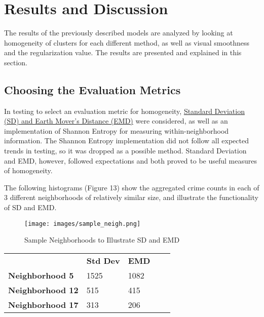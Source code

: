 \documentclass[times new roman,12pt]{article}
\begin{document}
\newpage

\section{Results and Discussion}
\label{res}

The results of the previously described models are analyzed by looking at homogeneity of clusters for each different method, as well as visual smoothness and the regularization value. The results are presented and explained in this section.

\subsection{Choosing the Evaluation Metrics}

In testing to select an evaluation metric for homogeneity, \hyperref[eval]{Standard Deviation (SD) and Earth Mover's Distance (EMD)} were considered, as well as an implementation of Shannon Entropy \cite{shannon1948mathematical} for measuring within-neighborhood information. The Shannon Entropy implementation did not follow all expected trends in testing, so it was dropped as a possible method. Standard Deviation and EMD, however, followed expectations and both proved to be useful measures of homogeneity. 

The following histograms (Figure 13) show the aggregated crime counts in each of 3 different neighborhoods of relatively similar size, and illustrate the functionality of SD and EMD. 

\begin{figure}[H]
\centering
  \texttt{[image: images/sample\_neigh.png]}
  \caption{Sample Neighborhoods to Illustrate SD and EMD}
  \label{fig:sample_nei}
\end{figure}


\begin{table}[H]
\centering
\begin{tabular}{l|l|l|ll}
\cline{2-3}
                                      & \textbf{Std Dev} & \textbf{EMD}  &  &  \\ \cline{1-3}
\multicolumn{1}{|l|}{\textbf{Neighborhood 5}}  & 1525    & 1082 &  &  \\ \cline{1-3}
\multicolumn{1}{|l|}{\textbf{Neighborhood 12}} & 515     & 415  &  &  \\ \cline{1-3}
\multicolumn{1}{|l|}{\textbf{Neighborhood 17}} & 313     & 206  &  &  \\ \cline{1-3}
\end{tabular}
\end{table}
\end{document}
